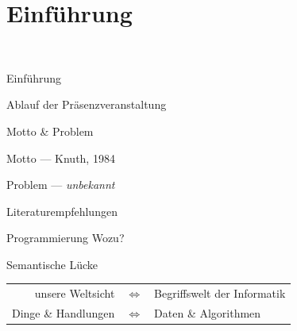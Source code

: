 \section{Einführung}\label{sec:0-einfuehrung}
\begin{frame}{~}
\begin{center}
\Huge Einführung
\end{center}
\end{frame}

\begin{frame}{Ablauf der Präsenzveranstaltung}
\end{frame}

\begin{frame}{Motto \& Problem}
    \begin{block}{Motto}
         --- Knuth, 1984
    \end{block}
    \begin{block}{Problem}
         --- \emph{unbekannt}
    \end{block}
\end{frame}

\begin{frame}{Literaturempfehlungen}
    \nocite{*}
    \printbibliography
\end{frame}

\begin{frame}{Programmierung Wozu?}
    \begin{block}{Semantische Lücke}
        \begin{tabular}{rcl}
            unsere Weltsicht&$\Leftrightarrow$&Begriffswelt der Informatik\\
            Dinge \& Handlungen&$\Leftrightarrow$&Daten \& Algorithmen
        \end{tabular}
    \end{block}
\end{frame}

